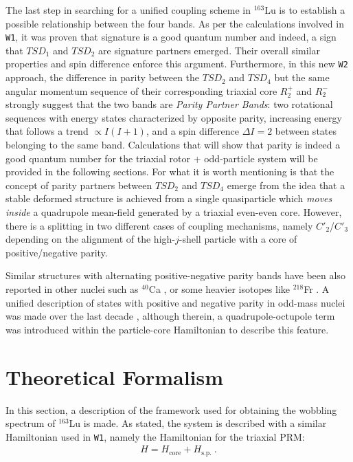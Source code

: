 \documentclass[myclassdoc,debug]{rjparticle}
\begin{document}
The last step in searching for a unified coupling scheme in $^{163}$Lu is to establish a possible relationship between the four bands. As per the calculations involved in \texttt{W1}, it was proven that signature is a good quantum number and indeed, a sign that $TSD_1$ and $TSD_2$ are signature partners emerged. Their overall similar properties and spin difference enforce this argument. Furthermore, in this new \texttt{W2} approach, the difference in parity between the $TSD_2$ and $TSD_4$ but the same angular momentum sequence of their corresponding triaxial core $R_2^+$ and $R_2^-$ strongly suggest that the two bands are \emph{Parity Partner Bands}: two rotational sequences with energy states characterized by opposite parity, increasing energy that follows a trend $\propto I(I+1)$, and a spin difference $\Delta I=2$ between states belonging to the same band. Calculations that will show that parity is indeed a good quantum number for the triaxial rotor + odd-particle system will be provided in the following sections. For what it is worth mentioning is that the concept of parity partners between $TSD_2$ and $TSD_4$ emerge from the idea that a stable deformed structure is achieved from a single quasiparticle which \emph{moves inside} a quadrupole mean-field generated by a triaxial even-even core. However, there is a splitting in two different cases of coupling mechanisms, namely $C'_2$/$C'_3$ depending on the alignment of the high-$j$-shell particle with a core of positive/negative parity.

Similar structures with alternating positive-negative parity bands have been also reported in other nuclei such as $^{40}$Ca \cite{torilov2004spectroscopy}, or some heavier isotopes like $^{218}$Fr \cite{debray2000alternating}. A unified description of states with positive and negative parity in odd-mass nuclei was made over the last decade \cite{radutaa2009csm,raduta2011simultaneous}, although therein, a quadrupole-octupole term was introduced within the particle-core Hamiltonian to describe this feature.

\section{Theoretical Formalism}
\label{section-theory}

In this section, a description of the framework used for obtaining the wobbling spectrum of $^{163}$Lu is made. As stated, the system is described with a similar Hamiltonian used in \texttt{W1}, namely the Hamiltonian for the triaxial PRM: 
\begin{align}
    H=H_\text{core}+H_\text{s.p.}\ .
    \label{prm-hamiltonian}
\end{align}
\end{document}
